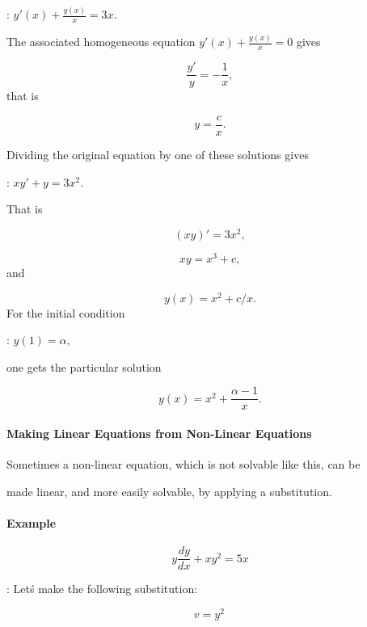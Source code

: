 :   $y'(x) + \frac{y(x)}{x} = 3x.$



The associated homogeneous equation $y'(x) + \frac{y(x)}{x} = 0$ gives



$$\frac{y'}{y}=-\frac{1}{x},$$ that is



$$y=\frac{c}{x}.$$



Dividing the original equation by one of these solutions gives



:   $xy'+y=3x^2.$



That is



$$(xy)'=3x^2,$$



$$xy=x^3 +c,$$ and



$$y(x)=x^2+c/x.$$ For the initial condition



:   $y(1)=\alpha,$



one gets the particular solution



$$y(x)=x^2+\frac{\alpha-1}{x}.$$



\paragraph{Making Linear Equations from Non-Linear Equations}



Sometimes a non-linear equation, which is not solvable like this, can be

made linear, and more easily solvable, by applying a substitution.



\paragraph{Example}



$$y\frac{dy}{dx}+xy^2=5x$$



:   Let\'s make the following substitution:



$$v=y^2 \,$$




